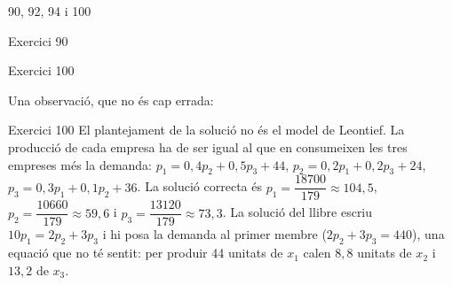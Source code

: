 
%
        {90, 92, 94 i 100}

\begin{errada}{Exercici 90}
\end{errada}

\begin{errada}{Exercici 100}
\end{errada}


\ifobs
\bigskip
\noindent
Una observació, que no és cap errada:\par\nopagebreak

\begin{observacio}{Exercici 100}
  El plantejament de la solució no és el model de Leontief. La producció de cada empresa ha de ser igual al que en consumeixen les tres empreses més la demanda: $p_1=0{,}4p_2+0{,}5p_3+44$, $p_2=0{,}2p_1+0{,}2p_3+24$, $p_3=0{,}3p_1+0{,}1p_2+36$. La solució correcta és $p_1=\dfrac{18700}{179}\approx 104{,}5$, $p_2=\dfrac{10660}{179}\approx 59{,}6$ i $p_3=\dfrac{13120}{179}\approx 73{,}3$. La solució del llibre escriu $10p_1=2p_2+3p_3$ i hi posa la demanda al primer membre ($2p_2+3p_3=440$), una equació que no té sentit: per produir 44 unitats de $x_1$ calen $8{,}8$ unitats de $x_2$ i $13{,}2$ de $x_3$.
\end{observacio}
\fi
